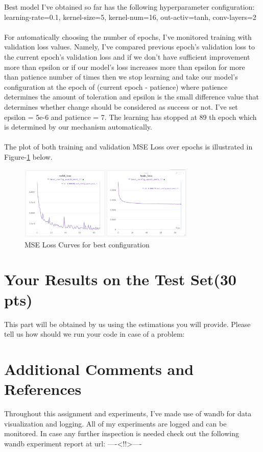 \documentclass[12pt]{article}
\begin{document}
    \begin{center}
        \raggedright
        Best model I've obtained so far has the following hyperparameter configuration:
        \\
        learning-rate=0.1, kernel-size=5, kernel-num=16, out-activ=tanh, conv-layers=2
        \\~\\
        For automatically choosing the number of epochs, I've monitored training with validation loss values. Namely,
        I've compared previous epoch's validation loss to the current epoch's validation loss and
        if we don't have sufficient improvement more than epsilon or if our model's loss increases more than epsilon
        for more than patience number of times then we stop learning and take our model's configuration at the epoch of (current epoch - patience) where
        patience determines the amount of toleration and epsilon is the small difference value that determines whether change should be considered as success or not.
        I've set epsilon = 5e-6  and patience = 7. The learning has stopped at 89 th epoch which is determined by our mechanism automatically.
        \\~\\
        The plot of both training and validation MSE Loss over epochs is illustrated in Figure-\ref*{fig:part-3_best_config_loss} below.

    \end{center}

    \begin{figure}[!htb]
        \centering
        \includegraphics[width=0.75\textwidth]{figures/best_config_loss.png}
        \caption{MSE Loss Curves for best configuration}
        \label{fig:part-3_best_config_loss}
    \end{figure}
    
\section{Your Results on the Test Set(30 pts)}
This part will be obtained by us using the estimations you will provide. Please tell us how should we run your code in case of a problem:

\section{Additional Comments and References}

Throughout this assignment and experiments, I've made use of wandb for data visualization and logging.
All of my experiments are logged and can be monitored. In case any further inspection is needed check out the following wandb experiment report at url:
----<!!>----
\end{document}
